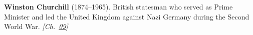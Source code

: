 \nobelliterature \textbf{Winston Churchill} (1874–1965). British statesman who served as Prime Minister and led the United Kingdom against Nazi Germany during the Second World War. \emph{[Ch.~\hyperref[ch:arrowtheoremtopology]{09}]}

